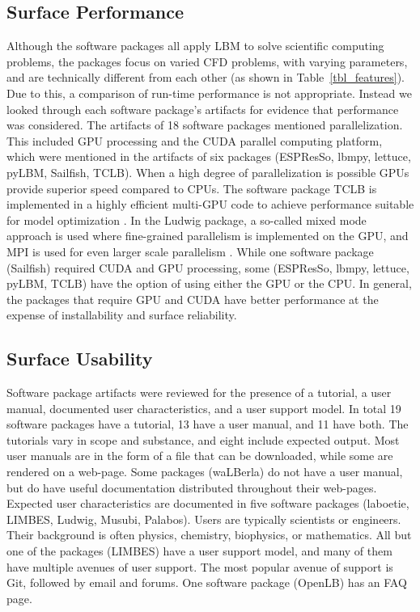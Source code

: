 \documentclass[final, 3p, times, authoryear]{elsarticle}
\begin{document}
\subsection{Surface Performance}

Although the software packages all apply LBM to solve scientific computing
problems, the packages focus on varied CFD problems, with varying parameters,
and are technically different from each other (as shown in
Table~\ref{tbl_features}). Due to this, a comparison of run-time performance is
not appropriate. Instead we looked through each software package's artifacts for
evidence that performance was considered. The artifacts of 18 software packages
mentioned parallelization. This included GPU processing and the CUDA parallel
computing platform, which were mentioned in the artifacts of six packages
(ESPResSo, lbmpy, lettuce, pyLBM, Sailfish, TCLB). When a high degree of
parallelization is possible GPUs provide superior speed compared to CPUs. The
software package TCLB is implemented in a highly efficient multi-GPU code to
achieve performance suitable for model optimization \citep{rutkowski2020open}.
In the Ludwig package, a so-called mixed mode approach is used where
fine-grained parallelism is implemented on the GPU, and MPI is used for even
larger scale parallelism \citep{gray2013ludwig}. While one software package
(Sailfish) required CUDA and GPU processing, some (ESPResSo, lbmpy, lettuce,
pyLBM, TCLB) have the option of using either the GPU or the CPU. In general, the
packages that require GPU and CUDA have better performance at the expense of
installability and surface reliability.

\subsection{Surface Usability}

Software package artifacts were reviewed for the presence of a tutorial, a user
manual, documented user characteristics, and a user support model. In total 19
software packages have a tutorial, 13 have a user manual, and 11 have both. The
tutorials vary in scope and substance, and eight include expected output. Most
user manuals are in the form of a file that can be downloaded, while some are
rendered on a web-page. Some packages (waLBerla) do not have a user manual, but
do have useful documentation distributed throughout their web-pages. Expected
user characteristics are documented in five software packages (laboetie, LIMBES,
Ludwig, Musubi, Palabos). Users are typically scientists or engineers. Their
background is often physics, chemistry, biophysics, or mathematics. All but one
of the packages (LIMBES) have a user support model, and many of them have
multiple avenues of user support. The most popular avenue of support is Git,
followed by email and forums. One software package (OpenLB) has an FAQ page.    
\end{document}
